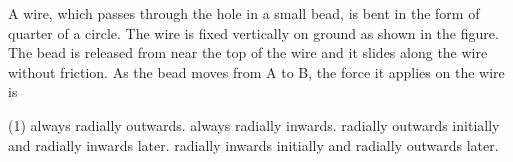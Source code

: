 
\item A wire, which passes through the hole in a small bead, is bent in the form of quarter of a circle. The wire is fixed vertically on ground as shown in the figure. The bead is released from near the top of the wire and it slides along the wire without friction. As the bead moves from A to B, the force it applies on the wire is
    \begin{center}
    \end{center}
    \begin{tasks}(1)
        \task always radially outwards.
        \task always radially inwards.
        \task radially outwards initially and radially inwards later.
        \task radially inwards initially and radially outwards later.
    \end{tasks}

